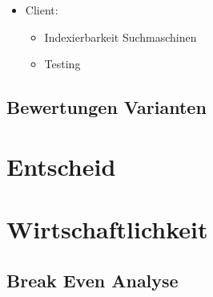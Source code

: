 \begin{itemize}
  \tightlist
  \item
        Client:
        \begin{itemize}
          \tightlist
          \item
                Indexierbarkeit Suchmaschinen
          \item
                Testing
        \end{itemize}
\end{itemize}

\subsection{Bewertungen Varianten}\label{bewertungen-varianten}

\section{Entscheid}\label{entscheid}

\section{Wirtschaftlichkeit}\label{wirtschaftlichkeit}

\subsection{Break Even Analyse}\label{break-even-analyse}
